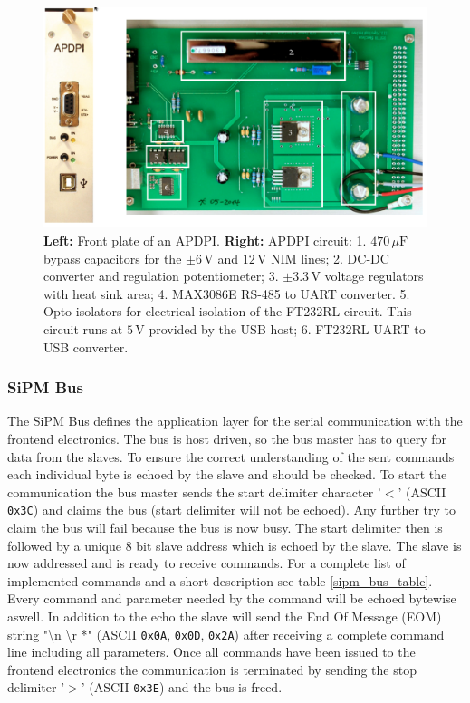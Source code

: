 \documentclass[]{article}
\begin{document}
	\begin{figure}[t]
		\centering
			\includegraphics[width=1.0\textwidth]{Figures/weinstock/apdpi.png}
		\caption{\textbf{Left:} Front plate of an APDPI. \textbf{Right:} APDPI circuit: 1. $470\,\mu \text{F}$ bypass capacitors for the $\pm6\,\text{V}$ and $12\,\text{V}$ 
												   NIM lines;
												2. DC-DC converter and regulation potentiometer;
												3. $\pm3.3\,\text{V}$ voltage regulators with heat sink area;
												4. MAX3086E RS-485 to UART converter.
												5. Opto-isolators for electrical isolation of the FT232RL circuit. This circuit runs
												at $5\,\text{V}$ provided by the USB host;
												6. FT232RL UART to USB converter.}
		\label{APDPI_front}
	\end{figure}	

\subsubsection{SiPM Bus}

The SiPM Bus defines the application layer for the serial communication with the frontend electronics. The bus is host driven, so the bus master has to query for data from the slaves.
To ensure the correct understanding of the sent commands each individual byte is echoed by the slave and should be checked. To start the communication the bus master sends the start
delimiter character '$<$' (ASCII \verb|0x3C|) and claims the bus (start delimiter will not be echoed). Any further try to claim the bus will fail because the bus is now busy. 
The start delimiter then is followed by a unique 8 bit slave address which is echoed by the slave. The slave is now addressed and is ready to receive commands. For a complete list of
implemented commands and a short description see table \ref{sipm_bus_table}. Every command and parameter needed by the command will be echoed bytewise aswell. In addition to the echo 
the slave will send the End Of Message (EOM) string "\textbackslash n \textbackslash r *" (ASCII \verb|0x0A|, \verb|0x0D|, \verb|0x2A|) after receiving a complete command line including all parameters. Once all commands have been issued to the frontend electronics the communication is terminated by sending the stop delimiter '$>$' (ASCII \verb|0x3E|) and the bus is freed. 
\end{document}
